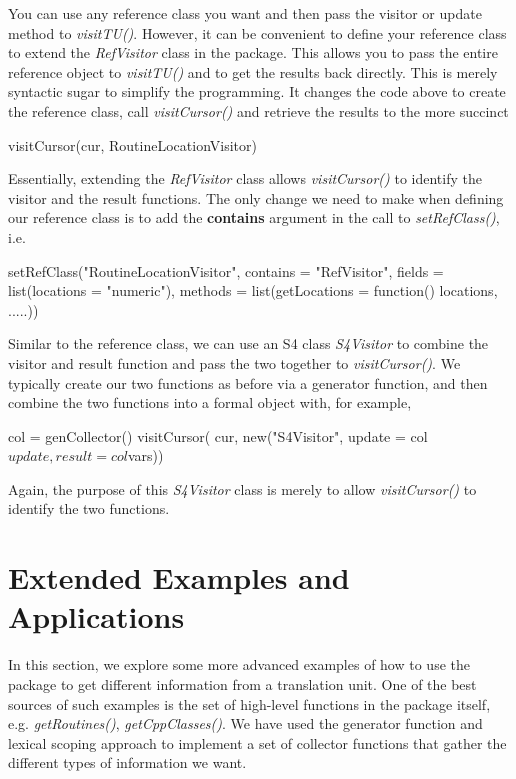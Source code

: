 \documentclass[article]{jss}
\def\Rpkg#1{\pkg{#1}}
\def\Rfunc#1{\textsl{#1()}}
\def\Rclass#1{\textit{#1}}
\def\Rarg#1{\textbf{#1}}
\begin{document}
You can use any reference class you want and then pass the visitor or
update method to \Rfunc{visitTU}.  However, it can be convenient to
define your reference class to extend the \Rclass{RefVisitor} class in
the \Rpkg{RCIndex} package. This allows you to pass the entire
reference object to \Rfunc{visitTU} and to get the results back
directly. This is merely syntactic sugar to simplify the
programming. It changes the code above to create the reference class,
call \Rfunc{visitCursor} and retrieve the results to the more succinct
\begin{RCode}
visitCursor(cur, RoutineLocationVisitor)
\end{RCode}
Essentially, extending the \Rclass{RefVisitor} class allows
\Rfunc{visitCursor} to identify the visitor and the result functions.
The only change we need to make when defining our reference class
is to add the \Rarg{contains} argument in the call to
\Rfunc{setRefClass}, i.e.
\begin{RCode}
setRefClass("RoutineLocationVisitor",
            contains = "RefVisitor",
            fields = list(locations = "numeric"),
            methods = list(getLocations = function() locations,
                       .....))
\end{RCode}



Similar to the reference class, we can use an S4 class
\Rclass{S4Visitor} to combine the visitor and result function
and pass the two together to \Rfunc{visitCursor}.
We typically create our two functions as before
via a generator function, and then combine the two 
functions into a formal object with, for example,
\begin{RCode}
col = genCollector()
visitCursor( cur, new("S4Visitor",  update = col$update, result = col$vars))
\end{RCode}
Again, the purpose of this \Rclass{S4Visitor} class is merely to 
allow \Rfunc{visitCursor} to identify the two functions.





\section{Extended Examples and Applications}
In this section, we explore some more advanced examples of how to use
the \Rpkg{RCIndex} package to get different information from a
translation unit.  One of the best sources of such examples is the set
of high-level functions in the package itself,
e.g. \Rfunc{getRoutines}, \Rfunc{getCppClasses}.  We have used the
generator function and lexical scoping approach to implement a set of
collector functions that gather the different types of information we
want.
\end{document}
